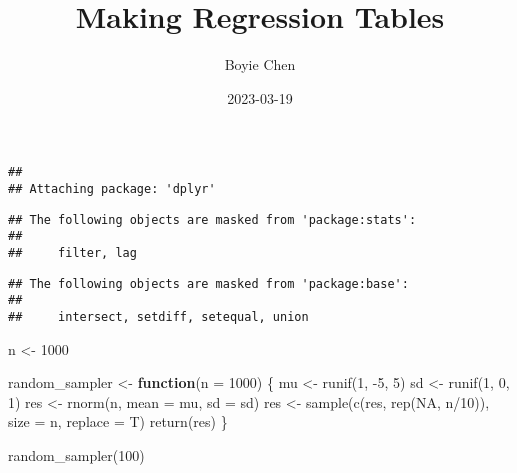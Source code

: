 \documentclass[
]{article}
\title{Making Regression Tables}
\author{Boyie Chen}
\date{2023-03-19}
\newenvironment{Shaded}{\begin{snugshade}}{\end{snugshade}}
\newcommand{\AttributeTok}[1]{\textcolor[rgb]{0.77,0.63,0.00}{#1}}
\newcommand{\ConstantTok}[1]{\textcolor[rgb]{0.00,0.00,0.00}{#1}}
\newcommand{\ControlFlowTok}[1]{\textcolor[rgb]{0.13,0.29,0.53}{\textbf{#1}}}
\newcommand{\DecValTok}[1]{\textcolor[rgb]{0.00,0.00,0.81}{#1}}
\newcommand{\FunctionTok}[1]{\textcolor[rgb]{0.00,0.00,0.00}{#1}}
\newcommand{\NormalTok}[1]{#1}
\newcommand{\OtherTok}[1]{\textcolor[rgb]{0.56,0.35,0.01}{#1}}
\newcommand{\SpecialCharTok}[1]{\textcolor[rgb]{0.00,0.00,0.00}{#1}}
\begin{document}
\maketitle

\begin{Shaded}
\end{Shaded}

\begin{verbatim}
## 
## Attaching package: 'dplyr'
\end{verbatim}

\begin{verbatim}
## The following objects are masked from 'package:stats':
## 
##     filter, lag
\end{verbatim}

\begin{verbatim}
## The following objects are masked from 'package:base':
## 
##     intersect, setdiff, setequal, union
\end{verbatim}

\begin{Shaded}
\begin{Highlighting}[]
\NormalTok{n }\OtherTok{\textless{}{-}} \DecValTok{1000}

\NormalTok{random\_sampler }\OtherTok{\textless{}{-}} \ControlFlowTok{function}\NormalTok{(}\AttributeTok{n =} \DecValTok{1000}\NormalTok{) \{}
\NormalTok{  mu }\OtherTok{\textless{}{-}} \FunctionTok{runif}\NormalTok{(}\DecValTok{1}\NormalTok{, }\SpecialCharTok{{-}}\DecValTok{5}\NormalTok{, }\DecValTok{5}\NormalTok{)}
\NormalTok{  sd }\OtherTok{\textless{}{-}} \FunctionTok{runif}\NormalTok{(}\DecValTok{1}\NormalTok{, }\DecValTok{0}\NormalTok{, }\DecValTok{1}\NormalTok{)}
\NormalTok{  res }\OtherTok{\textless{}{-}} \FunctionTok{rnorm}\NormalTok{(n, }\AttributeTok{mean =}\NormalTok{ mu, }\AttributeTok{sd =}\NormalTok{ sd)}
\NormalTok{  res }\OtherTok{\textless{}{-}} \FunctionTok{sample}\NormalTok{(}\FunctionTok{c}\NormalTok{(res, }\FunctionTok{rep}\NormalTok{(}\ConstantTok{NA}\NormalTok{, n}\SpecialCharTok{/}\DecValTok{10}\NormalTok{)), }\AttributeTok{size =}\NormalTok{ n, }\AttributeTok{replace =}\NormalTok{ T)}
  \FunctionTok{return}\NormalTok{(res)}
\NormalTok{\}}

\FunctionTok{random\_sampler}\NormalTok{(}\DecValTok{100}\NormalTok{)}
\end{Highlighting}
\end{Shaded}
\end{document}
